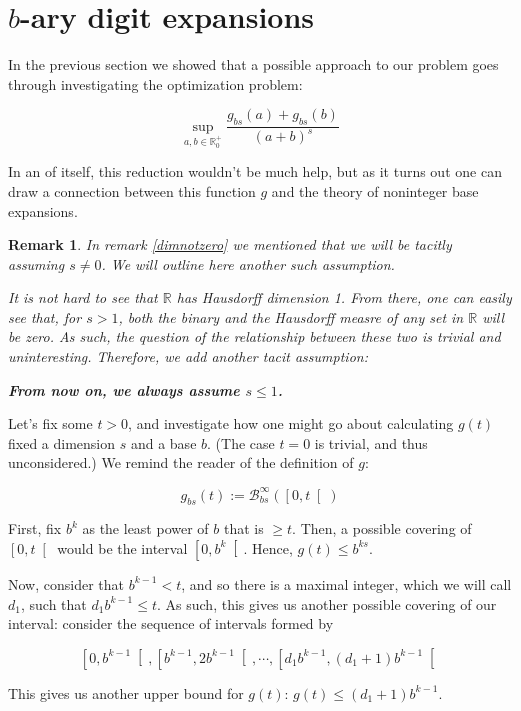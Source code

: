 \documentclass[11pt]{amsart}
\newcommand{\R}{\mathbb{R}}
\newcommand{\BB}{\mathcal{B}}
\newtheorem{remark}{Remark}
\begin{document}
\section{$b$-ary digit expansions}

In the previous section we showed that a possible approach to our problem goes through investigating the optimization problem:

\[ \sup_{a,b \in \R^+_0} \frac{g_{bs}(a) + g_{bs}(b)}{(a + b)^s} \]

In an of itself, this reduction wouldn't be much help, but as it turns out one can draw a connection between this function $g$ and the theory of noninteger base expansions.

\begin{remark}
In remark \ref{dimnotzero} we mentioned that we will be tacitly assuming $s \neq 0$. We will outline here another such assumption.

It is not hard to see that $\R$ has Hausdorff dimension 1. From there, one can easily see that, for $s > 1$, both the binary and the Hausdorff measre of \emph{any} set in $\R$ will be zero. As such, the question of the relationship between these two is trivial and uninteresting. Therefore, we add another tacit assumption:

\textbf{From now on, we always assume $s \leq 1$.}
\end{remark}

Let's fix some $t > 0$, and investigate how one might go about calculating $g(t)$ fixed a dimension $s$ and a base $b$. (The case $t = 0$ is trivial, and thus unconsidered.) We remind the reader of the definition of $g$:

\[g_{bs}(t) := \BB_{bs}^\infty(\left[0, t \right[)\]

First, fix $b^k$ as the least power of $b$ that is $\geq t$. Then, a possible covering of $\left[0, t \right[$ would be the interval $\left[0, b^k\right[$. Hence, $g(t) \leq b^{ks}$.

Now, consider that $b^{k-1} < t$, and so there is a maximal integer, which we will call $d_1$, such that $d_1 b^{k-1} \leq t$. As such, this gives us another possible covering of our interval: consider the sequence of intervals formed by

\[\left[0, b^{k-1} \right[, \left[b^{k-1}, 2 b^{k-1} \right[, \cdots, \left[d_1 b^{k-1}, (d_1 + 1) b^{k-1} \right[ \]

This gives us another upper bound for $g(t)$: $g(t) \leq (d_1 + 1) b^{k-1}$.
\end{document}
